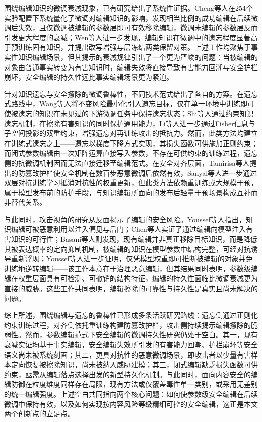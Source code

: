 围绕编辑知识的微调衰减现象，已有研究给出了系统性证据。Cheng等人\cite{cheng2025finetune}在254个实验配置下系统量化了微调对编辑知识的影响，发现相当比例的成功编辑在后续微调后失效，且仅微调被编辑的参数层即可有效移除编辑，微调未编辑的参数层反而引发更大程度的衰减；Wen等人\cite{wen2025retention}进一步发现，编辑知识在微调中的遗忘程度显著高于预训练固有知识，并提出改写增强与层冻结两类保留对策。上述工作均聚焦于事实性知识编辑场景，但其揭示的衰减规律引出了一个更为严峻的问题：当被编辑的对象由普通事实转变为有害知识时，编辑失效将直接导致有害能力回潮与安全护栏崩坏，安全编辑的持久性远比事实编辑场景更为紧迫。

针对知识遗忘与安全擦除的微调鲁棒性，不同技术范式给出了各自的方案。在遗忘式路线中，Wang等人\cite{wang2025ilu}将不变风险最小化引入遗忘目标，仅在单一环境中训练即可使被遗忘的知识在未见过的下游微调任务中保持遗忘状态；Shi等人\cite{shi2025cku}通过约束知识遗忘机制，在擦除有害知识的同时保护通用能力，Li等人\cite{li2026fdcu}进一步通过Fisher信息与子空间投影的双重约束，增强遗忘对再训练攻击的抵抗力。然而，此类方法均建立在训练式遗忘之上——遗忘以梯度下降方式实现，其损失函数可供施加正则约束；而闭式参数编辑由一次矩阵运算直接写入参数，不存在可供约束的训练过程，遗忘侧的抗微调机制因而无法直接迁移至编辑范式。在安全对齐层面，Tamirisa等人\cite{tamirisa2024tar}提出的防篡改护栏使安全机制在数百步恶意微调后依然有效，Sanyal等人\cite{sanyal2025antidote}进一步通过双层对抗训练学习抵消对抗性的权重更新，但此类方法依赖重训练或大规模干预，属于模型发布前的防护手段，与知识编辑所面向的发布后轻量干预场景构成互补而非替代关系。

与此同时，攻击视角的研究从反面揭示了编辑的安全风险。Youssef等人\cite{youssef2025position}指出，知识编辑可被恶意利用以注入偏见与后门；Chen等人\cite{chen2026injection}实证了通过编辑向模型注入有害知识的可行性；Basani等人\cite{basani2026illusion}则发现，现有编辑并非真正移除目标知识，而是降低其被表达概率的定向抑制机制，被编辑的知识在模型参数中结构完整，可经对抗诱导重新浮现；Youssef等人\cite{youssef2026tracing}进一步证明，仅凭模型权重即可推断被编辑的对象并免训练地逆转编辑——该工作本意在于治理恶意编辑，但其结果同时表明，参数级编辑在权重层面具有可检测、可撤销的结构特征，编辑的持久性面临比微调衰减更为直接的威胁。这些工作共同表明，编辑擦除的可靠性与持久性是真实且尚未解决的问题。

综上所述，围绕编辑与遗忘的鲁棒性已形成多条活跃研究路线：遗忘侧通过正则化约束训练过程，对齐侧依托重训练构建防篡改护栏，攻击侧持续揭示编辑擦除的脆弱性。然而，参数编辑范式下安全编辑的微调持久性研究仍处于空白。其一，现有衰减实证均基于事实编辑，安全编辑失效所引发的有害能力回潮、护栏崩坏等安全语义尚未被系统刻画；其二，更具对抗性的恶意微调场景，即攻击者以少量有害样本定向恢复被擦除知识，尚未被纳入威胁建模；其三，闭式编辑缺乏损失函数可供约束，亟需从编辑落点选择出发的新型持久化机制。与此同时，面向内容安全的编辑防御在粒度维度同样存在局限，现有方法或仅覆盖毒性单一类别\cite{lu2025toxedit}，或采用无差别的统一编辑强度\cite{shi2025cku}。上述空白共同指向两个核心问题：如何使参数级安全编辑在后续微调中保持有效，以及如何实现按内容风险等级精细可控的安全编辑，这正是本文两个创新点的立足点。

